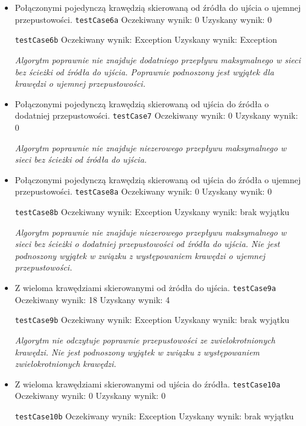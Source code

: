 \begin{itemize}[nosep]
    \item Połączonymi pojedynczą krawędzią skierowaną od źródła do ujścia o ujemnej przepustowości.
    \texttt{testCase6a}
    Oczekiwany wynik: 0
    Uzyskany wynik: 0

    \texttt{testCase6b}
    Oczekiwany wynik: Exception
    Uzyskany wynik: Exception

    \emph{Algorytm poprawnie nie znajduje dodatniego przepływu maksymalnego
    w sieci bez ścieżki od źródła do ujścia. Poprawnie podnoszony jest wyjątek
    dla krawędzi o ujemnej przepustowości.}

    \item Połączonymi pojedynczą krawędzią skierowaną od ujścia do źródła o dodatniej przepustowości.
    \texttt{testCase7}
    Oczekiwany wynik: 0
    Uzyskany wynik: 0

    \emph{Algorytm poprawnie nie znajduje niezerowego przepływu maksymalnego
    w sieci bez ścieżki od źródła do ujścia.}

    \item Połączonymi pojedynczą krawędzią skierowaną od ujścia do źródła o ujemnej przepustowości.
    \texttt{testCase8a}
    Oczekiwany wynik: 0
    Uzyskany wynik: 0

    \texttt{testCase8b}
    Oczekiwany wynik: Exception
    Uzyskany wynik: brak wyjątku

    \emph{Algorytm poprawnie nie znajduje niezerowego przepływu maksymalnego w sieci
    bez ścieżki o dodatniej przepustowości od źródła do ujścia. Nie jest podnoszony 
    wyjątek w związku z występowaniem krawędzi o ujemnej przepustowości.}

    \item Z wieloma krawędziami skierowanymi od żródła do ujścia.
    \texttt{testCase9a}
    Oczekiwany wynik: 18
    Uzyskany wynik: 4

    \texttt{testCase9b}
    Oczekiwany wynik: Exception
    Uzyskany wynik: brak wyjątku

    \emph{Algorytm nie odczytuje poprawnie przepustowości ze zwielokrotnionych
    krawędzi. Nie jest podnoszony wyjątek w związku z występowaniem
    zwielokrotnionych krawędzi.}

    \item Z wieloma krawędziami skierowanymi od ujścia do źródła.
    \texttt{testCase10a}
    Oczekiwany wynik: 0
    Uzyskany wynik: 0

    \texttt{testCase10b}
    Oczekiwany wynik: Exception
    Uzyskany wynik: brak wyjątku


\end{itemize}
